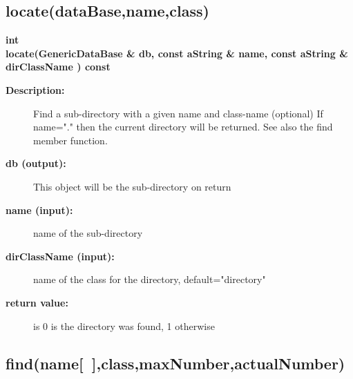 \subsection{locate(dataBase,name,class)}
 
\begin{flushleft} \textbf{%
int  \\ 
\settowidth{\GenericDataBaseIncludeArgIndent}{locate(}%
locate(GenericDataBase \& db, const aString \& name, const aString \& dirClassName ) const
}\end{flushleft}
\begin{description}
\item[{\bf Description:}] 
   Find a sub-directory with a given name and class-name (optional)
   If name="." then the current directory will be returned.
   See also the find member function.
\item[{\bf db (output):}]  This object will be the sub-directory on return
\item[{\bf name (input):}]  name of the sub-directory
\item[{\bf dirClassName (input):}]  name of the class for the directory, default="directory"
\item[{\bf return value:}]  is 0 is the directory was found, 1 otherwise

\end{description}
\subsection{find(name[~],class,maxNumber,actualNumber) }
 
